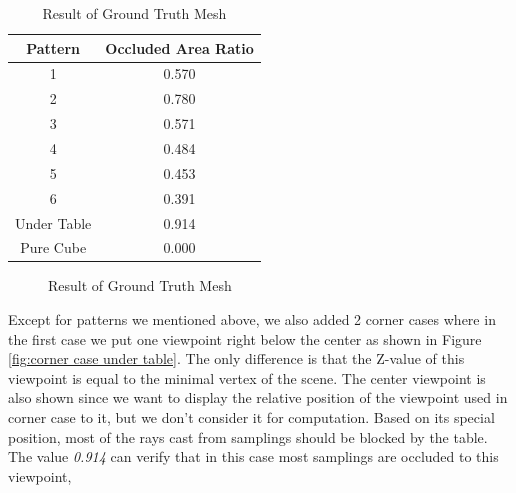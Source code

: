 \documentclass[11pt, a4paper,oneside,chapterprefix=false]{scrbook}
\begin{document}
\begin{table}[h]
    \centering
    \begin{tabular}{|c|c|}
        \hline
        \textbf{Pattern} & \textbf{Occluded Area Ratio} \\
        \hline
        1 & 0.570 \\
        2 & 0.780 \\
		3 & 0.571 \\
		4 & 0.484 \\
        5 & 0.453\\
        6 & 0.391\\
        Under Table & 0.914 \\
        Pure Cube & 0.000 \\

        \hline
    \end{tabular}
    \caption{Result of Ground Truth Mesh}
    \label{tab:result of gt mesh}
\end{table}

\begin{figure}[H]
    \centering
    \caption{Result of Ground Truth Mesh}
    \label{fig:result of gt mesh}
\end{figure}

\vspace{10pt}

Except for patterns we mentioned above, we also added 2 corner cases where in the first case we put one viewpoint right below the center as shown in Figure \ref{fig:corner case under table}. The only difference is that the Z-value of this viewpoint is equal to the minimal vertex of the scene. The center viewpoint is also shown since we want to display the relative position of the viewpoint used in corner case to it, but we don't consider it for computation. Based on its special position, most of the rays cast from samplings should be blocked by the table. The value \emph{0.914} can verify that in this case most samplings are occluded to this viewpoint, 
\end{document}
